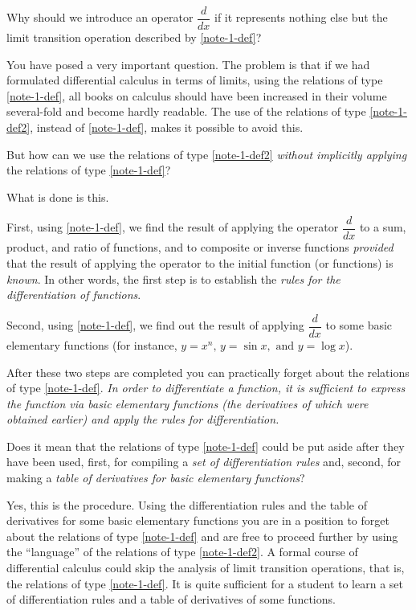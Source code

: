 \rdr Why should we introduce an operator $\dfrac{d}{dx}$ if it represents nothing else but the limit transition operation described by \eqref{note-1-def}?

\athr You have posed a very important question. The problem is that if we had formulated differential calculus in terms of limits, using the relations of type \eqref{note-1-def}, all books on calculus should have been increased in their volume several-fold and become hardly readable. The use of the relations of type \eqref{note-1-def2}, instead of \eqref{note-1-def}, makes it possible to avoid this.

\rdr But how can we use the relations of type \eqref{note-1-def2} \emph{without implicitly applying} the relations of type \eqref{note-1-def}?

\athr What is done is this. 

First, using \eqref{note-1-def}, we find the result of applying the operator $\dfrac{d}{dx}$ to a sum, product, and ratio of functions, and to composite
or inverse functions \emph{provided} that the result of applying the operator to the initial function (or functions) is \emph{known}. In other words, the first step is to establish the \emph{rules for the differentiation of functions}.

Second, using  \eqref{note-1-def}, we find out the result of applying $\dfrac{d}{dx}$ to some basic elementary functions (for instance, $y = x^{n}, \, y = \sin x, \,\, \text{and} \,\, y = \log x$).

After these two steps are completed you can practically forget about the relations of type \eqref{note-1-def}. \emph{In order to differentiate a function, it is sufficient to express the function via basic elementary functions (the derivatives of which were obtained earlier) and apply the rules for differentiation.}

\rdr Does it mean that the relations of type \eqref{note-1-def}
could be put aside after they have been used, first, for compiling a \emph{set of differentiation rules} and, second, for making a \emph{table of derivatives for basic elementary functions}?

\athr Yes, this is the procedure. Using the differentiation rules and the table of derivatives for some basic elementary functions you are in a position to forget about the relations of type \eqref{note-1-def} and are free to proceed further by using the ``language'' of the relations of type \eqref{note-1-def2}. A formal course of differential calculus could skip the analysis of limit transition operations, that is, the relations of type \eqref{note-1-def}. It is quite sufficient for a student to learn a set of differentiation rules and a table of derivatives of some functions.

